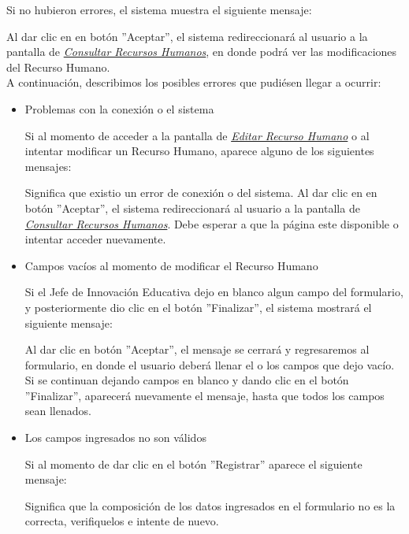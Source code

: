 Si no hubieron errores, el sistema muestra el siguiente mensaje:

Al dar clic en en botón ''Aceptar'', el sistema redireccionará al usuario a la pantalla de \hyperlink{consultarrh}{\textit{Consultar Recursos Humanos}}, en donde podrá ver las modificaciones del Recurso Humano.\\

A continuación, describimos los posibles errores que pudiésen llegar a ocurrir:

\begin{itemize}
	\item Problemas con la conexión o el sistema

	Si al momento de acceder a la pantalla de \hyperlink{editarrh}{\textit{Editar Recurso Humano}} o al intentar modificar un Recurso Humano, aparece alguno de los siguientes mensajes:

	Significa que existio un error de conexión o del sistema. Al dar clic en en botón ''Aceptar'', el sistema redireccionará al usuario a la pantalla de \hyperlink{consultarrh}{\textit{Consultar Recursos Humanos}}. Debe esperar a que la página este disponible o intentar acceder nuevamente.

	\item Campos vacíos al momento de modificar el Recurso Humano

	Si el Jefe de Innovación Educativa dejo en blanco algun campo del formulario, y posteriormente dio clic en el botón ''Finalizar'', el sistema mostrará el siguiente mensaje:

	Al dar clic en botón ''Aceptar'', el mensaje se cerrará y regresaremos al formulario, en donde el usuario deberá llenar el o los campos que dejo vacío. Si se continuan dejando campos en blanco y dando clic en el botón ''Finalizar'', aparecerá nuevamente el mensaje, hasta que todos los campos sean llenados.

	\item Los campos ingresados no son válidos

	Si al momento de dar clic en el botón ''Registrar'' aparece el siguiente mensaje:

	Significa que la composición de los datos ingresados en el formulario no es la correcta, verifiquelos e intente de nuevo.

\end{itemize}
